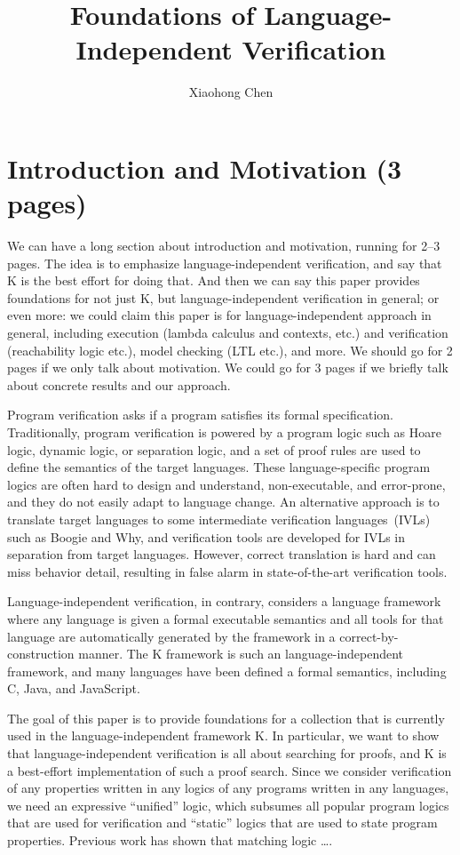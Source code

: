\documentclass[letter,12pt]{article}
\newcommand{\K}{K\xspace}
\begin{document}
\title{Foundations of Language-Independent Verification}
\author{Xiaohong Chen}
\maketitle

\section{Introduction and Motivation (3 pages)}

{We can have a long section about introduction and motivation, running for 2--3 pages. The idea is to emphasize language-independent verification, and say that \K is the best effort for doing that. And then we can say this paper provides foundations for
not just \K, but language-independent verification in general; or even more:
we could claim this paper is for language-independent approach in general, including execution (lambda calculus and contexts, etc.) and verification (reachability logic etc.), model checking (LTL etc.), and more. 
We should go for 2 pages if we only talk about motivation. 
We could go for 3 pages if we briefly talk about concrete results and
our approach.}

Program verification asks if a program
satisfies its formal specification.
Traditionally, program verification is powered by
a program logic such as 
Hoare logic, dynamic logic, or separation logic,
and a set of proof rules are used to define
the semantics of the target languages.
These language-specific program logics are often hard to
design and understand, non-executable, and error-prone,
and they do not easily adapt to language change.
An alternative approach is to translate 
target languages to some 
intermediate verification languages~(IVLs)
such as Boogie and Why,
and verification tools are developed for IVLs
in separation from target languages.
However, correct translation is hard and can miss
behavior detail, resulting in
false alarm in state-of-the-art verification tools.

Language-independent verification, in contrary, 
considers a language framework
where any language is given a formal executable semantics
and all tools for that language
are automatically generated by the framework in a
correct-by-construction manner.
The \K framework is such an language-independent framework,
and many languages have been defined a formal semantics,
including C, Java, and JavaScript.

The goal of this paper is to provide foundations for
a collection that is currently used in the language-independent
framework \K.
In particular, we want to show that
language-independent verification is all about 
searching for proofs,
and \K is a best-effort implementation of such a proof search.
Since we consider verification of
any properties written in any logics 
of any programs written in any languages,
we need an expressive ``unified'' logic,
which subsumes all popular program logics that are used
for verification and ``static'' logics that are used
to state program properties. 
Previous work has shown that matching logic \dots.
\end{document}
